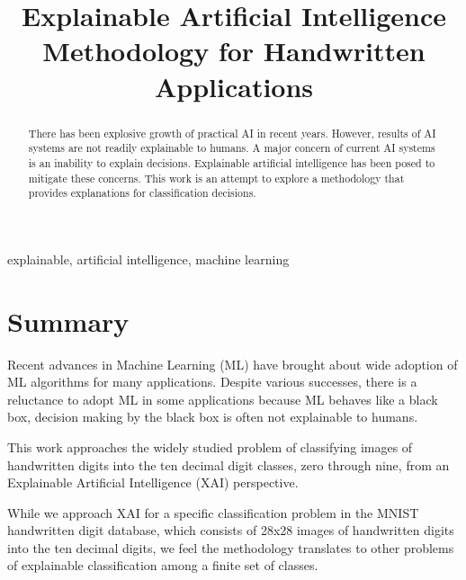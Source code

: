 \documentclass[conference]{IEEEtran}
\begin{document}
\title{Explainable Artificial Intelligence \\ {Methodology for Handwritten Applications}}

\author{

}

\maketitle

\begin{abstract}
There has been explosive growth of practical AI in recent years.
However, results of AI systems are not readily explainable to humans.
A major concern of current AI systems is an inability to explain decisions.
Explainable artificial intelligence has been posed to mitigate these concerns.
This work is an attempt to explore a methodology that provides explanations
for classification decisions.
\end{abstract}

\begin{IEEEkeywords}
explainable, artificial intelligence, machine learning
\end{IEEEkeywords}

\section{Summary}

Recent advances in Machine Learning (ML) have brought about wide adoption of ML algorithms for many applications.  Despite various successes, there is a reluctance to adopt ML in some applications because ML behaves like a black box, decision making by the black box is often not explainable to humans.  

This work approaches the widely studied problem of classifying images of handwritten digits into the ten decimal digit classes, zero through nine, from an Explainable Artificial Intelligence (XAI) perspective.

While we approach XAI for a specific classification problem in the MNIST handwritten digit database, which consists of 28x28 images of handwritten digits into the ten decimal digits, we feel the methodology translates to other problems of explainable classification among a finite set of classes.
\end{document}
